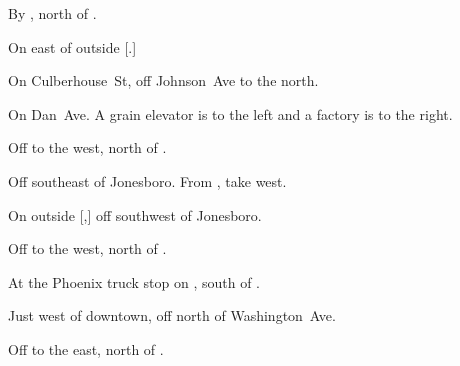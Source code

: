 
\begin{LocationList}

By , north of .

On  east of  outside [.]

On Culberhouse~St, off  Johnson~Ave to the north.

On  Dan~Ave.
A grain elevator is to the left and a factory is to the right.

\Location{\GarageHQ \Garage}
Off  to the west, north of .

Off  southeast of Jonesboro.
From , take  west.

On  outside [,] off  southwest of Jonesboro.

Off  to the west, north of .

At the Phoenix truck stop on , south of .

Just west of downtown, off  north of Washington~Ave.

Off  to the east, north of .

\end{LocationList}
